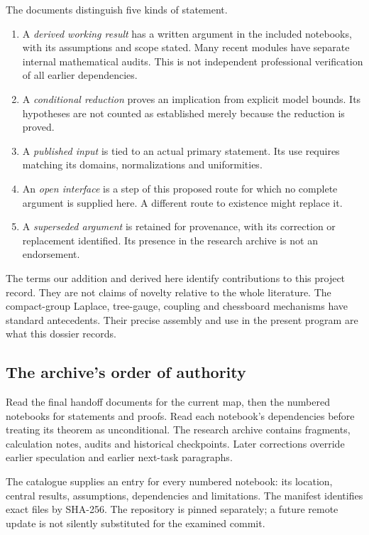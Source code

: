 \documentclass[11pt]{article}
\theoremstyle{remark}
\begin{document}
The documents distinguish five kinds of statement.
\begin{enumerate}
\item A \emph{derived working result} has a written argument in the
included notebooks, with its assumptions and scope stated. Many
recent modules have separate internal mathematical audits.
This is not independent professional verification of all earlier
dependencies.
\item A \emph{conditional reduction} proves an implication from
explicit model bounds. Its hypotheses are not counted as established
merely because the reduction is proved.
\item A \emph{published input} is tied to an actual primary statement.
Its use requires matching its domains, normalizations and uniformities.
\item An \emph{open interface} is a step of this proposed route
for which no complete argument is supplied here. A different
route to existence might replace it.
\item A \emph{superseded argument} is retained for provenance, with
its correction or replacement identified. Its presence in the
research archive is not an endorsement.
\end{enumerate}

The terms our addition and derived here identify contributions
to this project record. They are not claims of novelty relative
to the whole literature. The compact-group Laplace, tree-gauge,
coupling and chessboard mechanisms have standard antecedents.
Their precise assembly and use in the present program are what
this dossier records.

\subsection{The archive's order of authority}

Read the final handoff documents for the current map, then the
numbered notebooks for statements and proofs. Read each
notebook's dependencies before treating its theorem as
unconditional. The research archive contains fragments,
calculation notes, audits and historical checkpoints. Later
corrections override earlier speculation and earlier next-task
paragraphs.

The catalogue supplies an entry for every numbered notebook:
its location, central results, assumptions, dependencies and
limitations. The manifest identifies exact files by SHA-256.
The repository is pinned separately; a future remote update
is not silently substituted for the examined commit.
\end{document}
